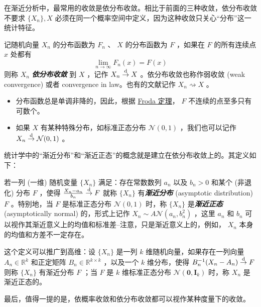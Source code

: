 在渐近分析中，最常用的收敛是依分布收敛。相比于前面的三种收敛，依分布收敛不要求 $\{X_n\}, X$ 必须在同一个概率空间中定义，因为这种收敛只关心``分布''这一统计特征。

\begin{definition}
记随机向量 $X_n$ 的分布函数为 $F_n$ 、 $X$ 的分布函数为 $F$ ，如果在 $F$ 的所有连续点 $x$ 处都有\[\lim_{n\to \infty} F_n(x) = F(x)\]
则称 $X_n$ \textbf{\emph{依分布收敛 }}到 $X$ ，记作 $X_n\overset{\rm d}\to X$ 。依分布收敛也称作弱收敛 (weak convergence) 或者 convergence in law。也有的文献记作 $X_n\rightsquigarrow X$ 。
\end{definition}

\begin{remark}

\begin{itemize}
\tightlist
\item
  分布函数总是单调非降的，因此，根据 \href{https://en.wikipedia.org/wiki/Discontinuities_of_monotone_functions}{Froda 定理}， $F$ 不连续的点至多只有可数个。
\item
  如果 $X$ 有某种特殊分布，如标准正态分布 $\mathcal N(0,1)$ ，我们也可以记作 $X_n\overset{\rm d}\to\mathcal{N}(0,1)$ 。
\end{itemize}
\end{remark}

统计学中的``渐近分布''和``渐近正态''的概念就是建立在依分布收敛上的。其定义如下：

\begin{definition}\label{def:ch1:limit-distribution}
若一列 (一维) 随机变量 $\{X_n\}$ 满足：存在常数数列 $a_n$ 以及 $b_n>0$ 和某个 (非退化) 分布 $F$ ，使得 $\frac{X_n-a_n}{b_n}\overset{\rm d}\to F$
就称 $\{X_n\}$ 有\textbf{\emph{渐近分布}} (asymptotic distribution) $F$ 。特别地，当 $F$ 是标准正态分布 $\mathcal N(0,1)$ 时，称 $\{X_n\}$ 是\textbf{\emph{渐近正态}} (asymptotically normal) 的，形式上记作 $X_n\sim A\mathcal{N}(a_n,b_n^2)$ ，这里 $a_n$ 和 $b_n$ 可以视作其渐近意义上的均值和标准差--注意，只是渐近意义上的，例如， $X_n$ 本身的均值和方差不一定存在。

这个定义可以推广到高维：设 $\{X_n\}$ 是一列 $k$ 维随机向量，如果存在一列向量 $A_n\in \mathbb R^k$ 和正定矩阵 $B_n\in\mathbb R^{k\times k}$ ，以及一个 $k$ 维分布，使得 $B_n^{-1}(X_n-A_n)\overset{\rm d}\to F$
则称 $\{X_n\}$ 有渐近分布 $F$ ；当 $F$ 是 $k$ 维标准正态分布 $\mathcal N(\bm 0,\mathbf{I}_k)$ 时，称 $X_n$ 是渐近正态的。
\end{definition}

最后，值得一提的是，依概率收敛和依分布收敛都可以视作某种度量下的收敛。

